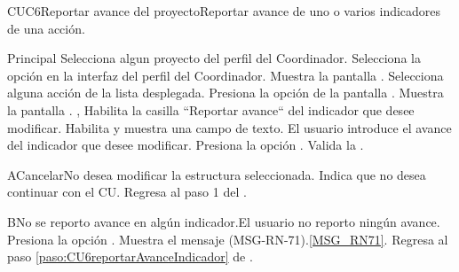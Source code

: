 
	\begin{UseCase}{CUC6}{Reportar avance del proyecto}{Reportar avance de uno o varios indicadores de una acción.}
	\end{UseCase}

	\begin{UCtrayectoria}{Principal}
		\UCpaso[\UCactor] Selecciona algun proyecto del perfil del Coordinador.
		\UCpaso[\UCactor] Selecciona la opción  en la interfaz del perfil del Coordinador.
		\UCpaso Muestra la pantalla  \label{paso:CU6reportarAvanceIndicador}. 
		\UCpaso[\UCactor] Selecciona alguna acción de la lista desplegada.
		\UCpaso[\UCactor] Presiona la opción  de la pantalla .
		\UCpaso Muestra la pantalla  \label{paso:CU6reportarAvanceIndicador}. , 
		\UCpaso[\UCactor] Habilita la casilla ``Reportar avance`` del indicador que desee modificar. 
		\UCpaso Habilita y muestra una campo de texto.
		\UCpaso[\UCactor] El usuario introduce el avance del indicador que desee modificar. 
		\UCpaso[\UCactor] Presiona la opción . 
		\UCpaso Valida la .
	\end{UCtrayectoria}

	\begin{UCtrayectoriaA}{A}{Cancelar}{No desea modificar la estructura seleccionada.}
		\UCpaso[\UCactor] Indica que no desea continuar con el CU.
		\UCpaso Regresa al paso 1 del .
	\end{UCtrayectoriaA}

	\begin{UCtrayectoriaA}{B}{No se reporto avance en algún indicador.}{El usuario no reporto ningún avance.}
		\UCpaso[\UCactor] Presiona la opción .
		\UCpaso Muestra el mensaje (MSG-RN-71).\ref{MSG_RN71}.
		\UCpaso Regresa al paso \ref{paso:CU6reportarAvanceIndicador} de . 
	\end{UCtrayectoriaA}

